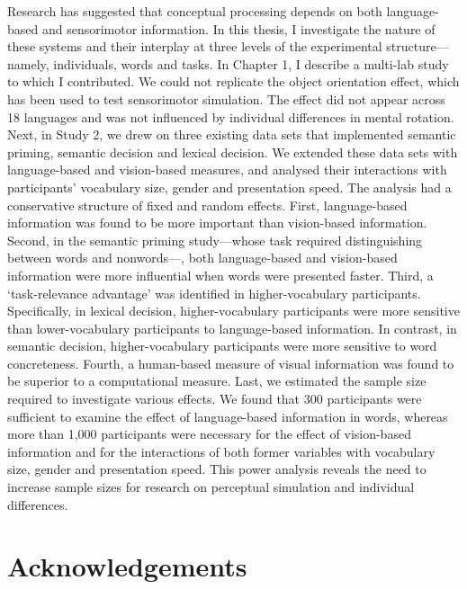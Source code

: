 \documentclass[
  12pt,
  man,floatsintext]{apa7}
\begin{document}
Research has suggested that conceptual processing depends on both language-based and sensorimotor information. In this thesis, I investigate the nature of these systems and their interplay at three levels of the experimental structure---namely, individuals, words and tasks. In Chapter 1, I describe a multi-lab study to which I contributed. We could not replicate the object orientation effect, which has been used to test sensorimotor simulation. The effect did not appear across 18 languages and was not influenced by individual differences in mental rotation. Next, in Study 2, we drew on three existing data sets that implemented semantic priming, semantic decision and lexical decision. We extended these data sets with language-based and vision-based measures, and analysed their interactions with participants' vocabulary size, gender and presentation speed. The analysis had a conservative structure of fixed and random effects. First, language-based information was found to be more important than vision-based information. Second, in the semantic priming study---whose task required distinguishing between words and nonwords---, both language-based and vision-based information were more influential when words were presented faster. Third, a `task-relevance advantage' was identified in higher-vocabulary participants. Specifically, in lexical decision, higher-vocabulary participants were more sensitive than lower-vocabulary participants to language-based information. In contrast, in semantic decision, higher-vocabulary participants were more sensitive to word concreteness. Fourth, a human-based measure of visual information was found to be superior to a computational measure. Last, we estimated the sample size required to investigate various effects. We found that 300 participants were sufficient to examine the effect of language-based information in words, whereas more than 1,000 participants were necessary for the effect of vision-based information and for the interactions of both former variables with vocabulary size, gender and presentation speed. This power analysis reveals the need to increase sample sizes for research on perceptual simulation and individual differences.

\newpage

\begin{flushleft}
{
\tableofcontents
}
\end{flushleft}

\newpage

\hypertarget{acknowledgements}{%
\section{Acknowledgements}\label{acknowledgements}}
\end{document}
